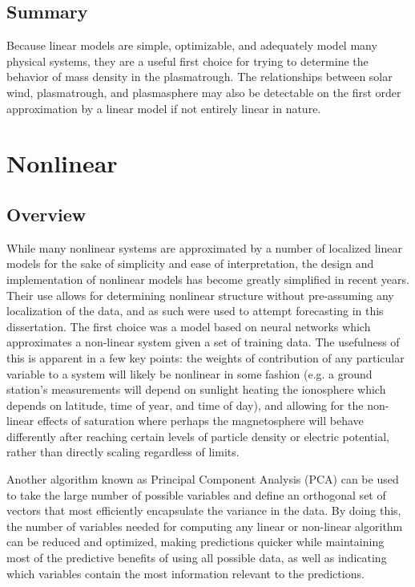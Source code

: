 \subsection{Summary}
Because linear models are simple, optimizable, and adequately model many physical systems, they are a useful first choice for trying to determine the behavior of mass density in the plasmatrough. The relationships between solar wind, plasmatrough, and plasmasphere may also be detectable on the first order approximation by a linear model if not entirely linear in nature.


\section{Nonlinear}

\subsection{Overview}

While many nonlinear systems are approximated by a number of localized linear models for the sake of simplicity and ease of interpretation, the design and implementation of nonlinear models has become greatly simplified in recent years. Their use allows for determining nonlinear structure without pre-assuming any localization of the data, and as such were used to attempt forecasting in this dissertation. The first choice was a model based on neural networks \citep{NNARMA,ANNforecast} which approximates a non-linear system given a set of training data. The usefulness of this is apparent in a few key points: the weights of contribution of any particular variable to a system will likely be nonlinear in some fashion (e.g. a ground station's measurements will depend on sunlight heating the ionosphere which depends on latitude, time of year, and time of day), and allowing for the non-linear effects of saturation where perhaps the magnetosphere will behave differently after reaching certain levels of particle density or electric potential, rather than directly scaling regardless of limits.

Another algorithm known as Principal Component Analysis (PCA) can be used to take the large number of possible variables and define an orthogonal set of vectors that most efficiently encapsulate the variance in the data. By doing this, the number of variables needed for computing any linear or non-linear algorithm can be reduced and optimized, making predictions quicker while maintaining most of the predictive benefits of using all possible data, as well as indicating which variables contain the most information relevant to the predictions.


